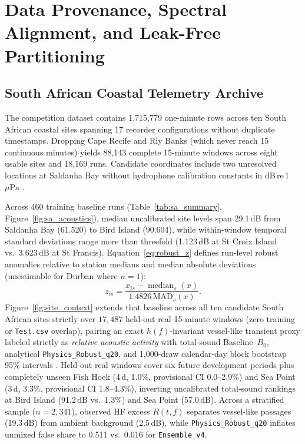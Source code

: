 \documentclass[10pt,a4paper]{article}
\begin{document}
\section{Data Provenance, Spectral Alignment, and Leak-Free Partitioning}

\subsection{South African Coastal Telemetry Archive}

The competition dataset contains 1,715,779 one-minute rows across ten South African coastal sites \parencite{zindi2026challenge} spanning 17 recorder configurations without duplicate timestamps. Dropping Cape Recife and Riy Banks (which never reach 15 continuous minutes) yields 88,143 complete 15-minute windows across eight usable sites and 18,169 runs. Candidate coordinates include two unresolved locations at Saldanha Bay without hydrophone calibration constants in dB\,re\,1\,$\mu\text{Pa}$ \parencite{iso2017underwater}.

Across 460 training baseline runs (Table~\ref{tab:sa_summary}, Figure~\ref{fig:sa_acoustics}), median uncalibrated site levels span 29.1\,dB from Saldanha Bay (61.520) to Bird Island (90.604), while within-window temporal standard deviations range more than threefold (1.123\,dB at St Croix Island vs.\ 3.623\,dB at St Francis). Equation~\eqref{eq:robust_z} defines run-level robust anomalies relative to station medians and median absolute deviations (unestimable for Durban where $n=1$):
\begin{equation}
\label{eq:robust_z}
z_{is} = \frac{x_{is} - \operatorname{median}_s(x)}{1.4826\,\mathrm{MAD}_s(x)}.
\end{equation}
Figure~\ref{fig:site_context} extends that baseline across all ten candidate South African sites strictly over $17{,}487$ held-out real 15-minute windows (zero training or \texttt{Test.csv} overlap), pairing an exact $h(f)$-invariant vessel-like transient proxy labeled strictly as \textit{relative acoustic activity} with total-sound Baseline~$B_0$, analytical \texttt{Physics\_Robust\_q20}, and 1,000-draw calendar-day block bootstrap 95\% intervals \parencite{robinson2014npl}. Held-out real windows cover six future development periods plus completely unseen Fish Hoek (4\,d, 1.0\%, provisional CI 0.0--2.9\%) and Sea Point (3\,d, 3.3\%, provisional CI 1.8--4.3\%), inverting uncalibrated total-sound rankings at Bird Island (91.2\,dB vs.\ 1.3\%) and Sea Point (57.0\,dB). Across a stratified sample ($n=2,341$), observed HF excess $R(t,f)$ separates vessel-like passages (19.3\,dB) from ambient background (2.5\,dB), while \texttt{Physics\_Robust\_q20} inflates unmixed false share to 0.511 vs.\ 0.016 for \texttt{Ensemble\_v4}.
\end{document}
